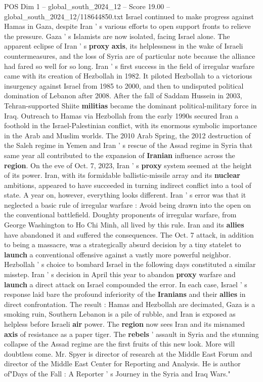 \begin{textsample}{POS Dim 1 – global\_south\_2024\_12 – Score 19.00 – global\_south\_2024\_12/118644850.txt}
Israel continued to make progress against Hamas in Gaza, despite Iran ' s various efforts to open support fronts to relieve the pressure.
Gaza ' s Islamists are now isolated, facing Israel alone.
The apparent eclipse of Iran ' s \textbf{proxy} \textbf{axis}, its helplessness in the wake of Israeli countermeasures, and the loss of Syria are of particular note because the alliance had fared so well for so long.
Iran ' s first success in the field of irregular warfare came with its creation of Hezbollah in 1982.
It piloted Hezbollah to a victorious insurgency against Israel from 1985 to 2000, and then to undisputed political domination of Lebanon after 2008.
After the fall of Saddam Hussein in 2003, Tehran-supported Shiite \textbf{militias} became the dominant political-military force in Iraq.
Outreach to Hamas via Hezbollah from the early 1990s secured Iran a foothold in the Israel-Palestinian conflict, with its enormous symbolic importance in the Arab and Muslim worlds.
The 2010 Arab Spring, the 2012 destruction of the Saleh regime in Yemen and Iran ' s rescue of the Assad regime in Syria that same year all contributed to the expansion of \textbf{Iranian} influence across the \textbf{region}.
On the eve of Oct. 7, 2023, Iran ' s \textbf{proxy} system seemed at the height of its power.
Iran, with its formidable ballistic-missile array and its \textbf{nuclear} ambitions, appeared to have succeeded in turning indirect conflict into a tool of state.
A year on, however, everything looks different.
Iran ' s error was that it neglected a basic rule of irregular warfare : Avoid being drawn into the open on the conventional battlefield.
Doughty proponents of irregular warfare, from George Washington to Ho Chi Minh, all lived by this rule.
Iran and its \textbf{allies} have abandoned it and suffered the consequences.
The Oct. 7 attack, in addition to being a massacre, was a strategically absurd decision by a tiny statelet to \textbf{launch} a conventional offensive against a vastly more powerful neighbor.
Hezbollah ' s choice to bombard Israel in the following days constituted a similar misstep.
Iran ' s decision in April this year to abandon \textbf{proxy} warfare and \textbf{launch} a direct attack on Israel compounded the error.
In each case, Israel ' s response laid bare the profound inferiority of the \textbf{Iranians} and their \textbf{allies} in direct confrontation.
The result : Hamas and Hezbollah are decimated, Gaza is a smoking ruin, Southern Lebanon is a pile of rubble, and Iran is exposed as helpless before Israeli \textbf{air} power.
The \textbf{region} now sees Iran and its misnamed \textbf{axis} of resistance as a paper tiger.
The \textbf{rebels} ' assault in Syria and the stunning collapse of the Assad regime are the first fruits of this new look.
More will doubtless come.
Mr.
Spyer is director of research at the Middle East Forum and director of the Middle East Center for Reporting and Analysis.
He is author of"Days of the Fall : A Reporter ' s Journey in the Syria and Iraq Wars."

\end{textsample}
